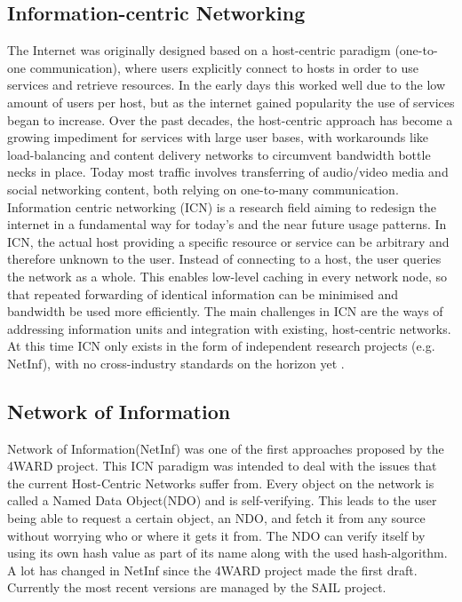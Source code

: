 \subsection{Information-centric Networking}
\label{sec:netinf}
The Internet was originally designed based on a host-centric paradigm (one-to-one communication), where users explicitly connect to hosts in order to use services and retrieve resources. In the early days this worked well due to the low amount of users per host, but as the internet gained popularity the use of services began to increase. Over the past decades, the host-centric approach has become a growing impediment for services with large user bases, with workarounds like load-balancing and content delivery networks to circumvent bandwidth bottle necks in place. Today most traffic involves transferring of audio/video media and social networking content, both relying on one-to-many communication. Information centric networking (ICN) is a research field aiming to redesign the internet in a fundamental way for today's and the near future usage patterns. In ICN, the actual host providing a specific resource or service can be arbitrary and therefore unknown to the user. Instead of connecting to a host, the user queries the network as a whole. This enables low-level caching in every network node, so that repeated forwarding of identical information can be minimised and bandwidth be used more efficiently. The main challenges in ICN are the ways of addressing information units and integration with existing, host-centric networks. At this time ICN only exists in the form of independent research projects (e.g. NetInf), with no cross-industry standards on the horizon yet \cite{ICNarticle}. 


\subsection{Network of Information}
Network of Information(NetInf) was one of the first approaches proposed by the 4WARD project. \cite{4ward} This ICN paradigm was intended to deal with the issues that the current Host-Centric Networks suffer from. Every object on the network is called a Named Data Object(NDO) and is self-verifying. This leads to the user being able to request a certain object, an NDO, and fetch it from any source without worrying who or where it gets it from. The NDO can verify itself by using its own hash value as part of its name along with the used hash-algorithm.
A lot has changed in NetInf since the 4WARD project made the first draft. Currently the most recent versions are managed by the SAIL project. \cite{netinfproto}

